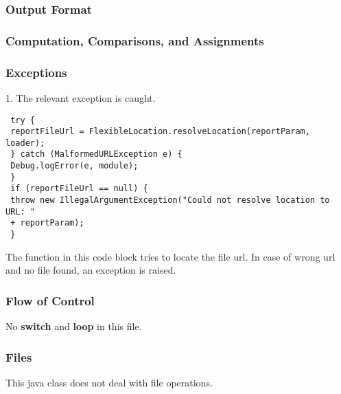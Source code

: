\documentclass{article}
\begin{document}
 \subsubsection{Output Format}
 \subsubsection{Computation, Comparisons, and Assignments}
 \subsubsection{Exceptions}
 1. The relevant exception is caught. 
 \begin{verbatim}
 try {
 reportFileUrl = FlexibleLocation.resolveLocation(reportParam, loader);
 } catch (MalformedURLException e) {
 Debug.logError(e, module);
 }
 if (reportFileUrl == null) {
 throw new IllegalArgumentException("Could not resolve location to URL: " 
 + reportParam);
 }
 \end{verbatim}
 The function in this code block tries to locate the file url. In case of wrong url and no file found, an exception is raised.
 \subsubsection{Flow of Control}
 No \textbf{switch} and \textbf{loop} in this file.
 \subsubsection{Files}
 This java class does not deal with file operations. 
\end{document}
